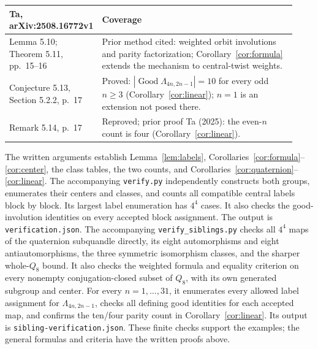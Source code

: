 \documentclass[11pt]{article}
\newcommand{\Good}{\operatorname{Good}}
\begin{document}
\begin{center}\small
\begin{tabular}{@{}>{\raggedright\arraybackslash}p{0.23\linewidth}>{\raggedright\arraybackslash}p{0.70\linewidth}@{}}\toprule
Ta, arXiv:2508.16772v1 & Coverage\\\midrule
Lemma 5.10; Theorem 5.11, pp.~15--16 & Prior method cited:
weighted orbit involutions and parity factorization;
Corollary~\ref{cor:formula} extends the mechanism to central-twist weights.\\
Conjecture 5.13, Section 5.2.2, p.~17 & Proved:
$|\Good\Lambda_{4n,2n-1}|=10$ for every odd $n\ge3$
(Corollary~\ref{cor:linear}); $n=1$ is an extension not posed there.\\
Remark 5.14, p.~17 & Reproved; prior proof Ta (2025):
the even-$n$ count is four (Corollary~\ref{cor:linear}).\\\bottomrule
\end{tabular}
\end{center}

The written arguments establish Lemma~\ref{lem:labels},
Corollaries~\ref{cor:formula}--\ref{cor:center}, the class tables,
the two counts, and Corollaries~\ref{cor:quaternion}--\ref{cor:linear}.
The accompanying \texttt{verify.py} independently constructs both groups,
enumerates their centers and classes, and counts all compatible central
labels block by block. Its largest label enumeration has $4^4$ cases.
It also checks the good-involution identities on every accepted block
assignment. The output is \texttt{verification.json}.
The accompanying \texttt{verify\_siblings.py} checks all $4^4$ maps
of the quaternion subquandle directly, its eight automorphisms and
eight antiautomorphisms, the three symmetric isomorphism classes,
and the sharper whole-$Q_8$ bound. It also checks the weighted formula
and equality criterion on every nonempty conjugation-closed subset
of $Q_8$, with its own generated subgroup and center. For every
$n=1,\ldots,31$, it enumerates every allowed label assignment for
$\Lambda_{4n,2n-1}$, checks all defining good identities for each accepted
map, and confirms the ten/four parity count in Corollary~\ref{cor:linear}.
Its output is \texttt{sibling-verification.json}. These finite checks support the
examples; the general formulas and criteria have the written proofs above.
\end{document}
